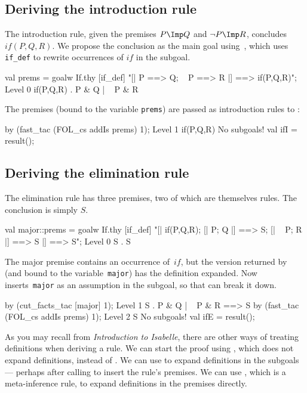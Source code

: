 \subsection{Deriving the introduction rule}
The introduction rule, given the premises $P\Imp Q$ and $\neg P\Imp R$,
concludes $if(P,Q,R)$.  We propose the conclusion as the main goal
using~, which uses {\tt if_def} to rewrite occurrences
of $if$ in the subgoal.
\begin{ttbox}
val prems = goalw If.thy [if_def]
    "[| P ==> Q; ~ P ==> R |] ==> if(P,Q,R)";
{\out Level 0}
{\out if(P,Q,R)}
{. P & Q | ~ P & R}
\end{ttbox}
The premises (bound to the {\ML} variable {\tt prems}) are passed as
introduction rules to :
\begin{ttbox}
by (fast_tac (FOL_cs addIs prems) 1);
{\out Level 1}
{\out if(P,Q,R)}
{\out No subgoals!}
val ifI = result();
\end{ttbox}


\subsection{Deriving the elimination rule}
The elimination rule has three premises, two of which are themselves rules.
The conclusion is simply $S$.
\begin{ttbox}
val major::prems = goalw If.thy [if_def]
   "[| if(P,Q,R);  [| P; Q |] ==> S; [| ~ P; R |] ==> S |] ==> S";
{\out Level 0}
{\out S}
{. S}
\end{ttbox}
The major premise contains an occurrence of~$if$, but the version returned
by  (and bound to the {\ML} variable~{\tt major}) has the
definition expanded.  Now  inserts~{\tt major} as an
assumption in the subgoal, so that  can break it down.
\begin{ttbox}
by (cut_facts_tac [major] 1);
{\out Level 1}
{\out S}
{. P & Q | ~ P & R ==> S}
\ttbreak
by (fast_tac (FOL_cs addIs prems) 1);
{\out Level 2}
{\out S}
{\out No subgoals!}
val ifE = result();
\end{ttbox}
As you may recall from {\em Introduction to Isabelle}, there are other
ways of treating definitions when deriving a rule.  We can start the
proof using , which does not expand definitions, instead of
.  We can use 
to expand definitions in the subgoals --- perhaps after calling
 to insert the rule's premises.  We can use
, which is a meta-inference rule, to expand
definitions in the premises directly.



